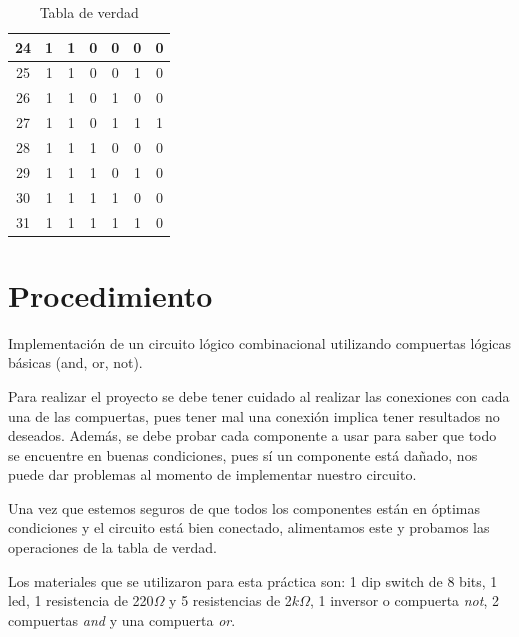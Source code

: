 \documentclass[12pt, oneside, openany]{article}
\begin{document}
{\begin{table}[h!]
\begin{tabular}{|c|c|c|c|c|c|c|}
            \hline
            24 & 1 & 1 & 0 & 0 & 0 & 0\\
            \hline
            25 & 1 & 1 & 0 & 0 & 1 & 0\\
            \hline
            26 & 1 & 1 & 0 & 1 & 0 & 0\\
            \hline
            27 & 1 & 1 & 0 & 1 & 1 & 1\\
            \hline
            28 & 1 & 1 & 1 & 0 & 0 & 0\\
            \hline
            29 & 1 & 1 & 1 & 0 & 1 & 0\\
            \hline
            30 & 1 & 1 & 1 & 1 & 0 & 0\\
            \hline
            31 & 1 & 1 & 1 & 1 & 1 & 0\\
            \hline
        \end{tabular}
        \caption{\sffamily Tabla de verdad}
        \label{tab:tablaVerdad}
    \end{table}
    
}

\newpage
\section{Procedimiento}
{\sffamily\Large
    \hspace{0.5cm} Implementación de un circuito lógico combinacional utilizando compuertas lógicas básicas (and, or, not).
    
    \hspace{0.5cm} Para realizar el proyecto se debe tener cuidado al realizar las conexiones con cada una de las compuertas, pues tener mal una conexión implica tener resultados no deseados. Además, se debe probar cada componente a usar para saber que todo se encuentre en buenas condiciones, pues sí un componente está dañado, nos puede dar problemas al momento de implementar nuestro circuito.
    
    \hspace{0.5cm} Una vez que estemos seguros de que todos los componentes están en óptimas condiciones y el circuito está bien conectado, alimentamos este y probamos las operaciones de la tabla de verdad.
    
    \hspace{0.5cm} Los materiales que se utilizaron para esta práctica son: 1 dip switch de 8 bits, 1 led, 1 resistencia de 220$\Omega$ y 5 resistencias de 2$k\Omega$, 1 inversor o compuerta \emph{not}, 2 compuertas \emph{and} y una compuerta \emph{or}.
    
}
\end{document}
